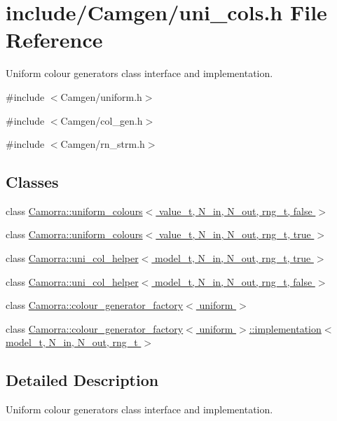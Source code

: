 \hypertarget{a00637}{
\section{include/Camgen/uni\_\-cols.h File Reference}
\label{a00637}
}


Uniform colour generators class interface and implementation.  


{\ttfamily \#include $<$Camgen/uniform.h$>$}\par
{\ttfamily \#include $<$Camgen/col\_\-gen.h$>$}\par
{\ttfamily \#include $<$Camgen/rn\_\-strm.h$>$}\par
\subsection*{Classes}
\begin{DoxyCompactItemize}
\item 
class \hyperlink{a00538}{Camorra::uniform\_\-colours$<$ value\_\-t, N\_\-in, N\_\-out, rng\_\-t, false $>$}
\item 
class \hyperlink{a00539}{Camorra::uniform\_\-colours$<$ value\_\-t, N\_\-in, N\_\-out, rng\_\-t, true $>$}
\item 
class \hyperlink{a00534}{Camorra::uni\_\-col\_\-helper$<$ model\_\-t, N\_\-in, N\_\-out, rng\_\-t, true $>$}
\item 
class \hyperlink{a00533}{Camorra::uni\_\-col\_\-helper$<$ model\_\-t, N\_\-in, N\_\-out, rng\_\-t, false $>$}
\item 
class \hyperlink{a00083}{Camorra::colour\_\-generator\_\-factory$<$ uniform $>$}
\item 
class \hyperlink{a00270}{Camorra::colour\_\-generator\_\-factory$<$ uniform $>$::implementation$<$ model\_\-t, N\_\-in, N\_\-out, rng\_\-t $>$}
\end{DoxyCompactItemize}


\subsection{Detailed Description}
Uniform colour generators class interface and implementation. 
